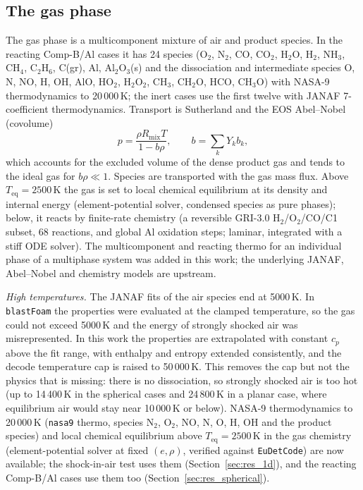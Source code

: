 \documentclass{article}
\begin{document}
\subsection{The gas phase}
\label{sec:gasphase}

The gas phase is a multicomponent mixture of air and product species. In the reacting Comp-B/Al cases it has 24 species (O$_2$, N$_2$, CO, CO$_2$, H$_2$O, H$_2$, NH$_3$, CH$_4$, C$_2$H$_6$, C(gr), Al, Al$_2$O$_3$(s) and the dissociation and intermediate species O, N, NO, H, OH, AlO, HO$_2$, H$_2$O$_2$, CH$_3$, CH$_2$O, HCO, CH$_3$O) with NASA-9 thermodynamics to 20\,000\,K; the inert cases use the first twelve with JANAF 7-coefficient thermodynamics. Transport is Sutherland and the EOS Abel--Nobel (covolume)
\begin{equation}
    p = \frac{\rho R_\text{mix} T}{1 - b\rho}, \qquad b = \sum_k Y_k b_k,
\end{equation}
which accounts for the excluded volume of the dense product gas and tends to the ideal gas for $b\rho \ll 1$. Species are transported with the gas mass flux. Above $T_\text{eq} = 2500$\,K the gas is set to local chemical equilibrium at its density and internal energy (element-potential solver, condensed species as pure phases); below, it reacts by finite-rate chemistry (a reversible GRI-3.0 H$_2$/O$_2$/CO/C1 subset, 68 reactions, and global Al oxidation steps; laminar, integrated with a stiff ODE solver). The multicomponent and reacting thermo for an individual phase of a multiphase system was added in this work; the underlying JANAF, Abel--Nobel and chemistry models are upstream.

\emph{High temperatures.} The JANAF fits of the air species end at 5000\,K. In \texttt{blastFoam} the properties were evaluated at the clamped temperature, so the gas could not exceed 5000\,K and the energy of strongly shocked air was misrepresented. In this work the properties are extrapolated with constant $c_p$ above the fit range, with enthalpy and entropy extended consistently, and the decode temperature cap is raised to 50\,000\,K. This removes the cap but not the physics that is missing: there is no dissociation, so strongly shocked air is too hot (up to 14\,400\,K in the spherical cases and 24\,800\,K in a planar case, where equilibrium air would stay near 10\,000\,K or below). NASA-9 thermodynamics to 20\,000\,K (\texttt{nasa9} thermo, species N$_2$, O$_2$, NO, N, O, H, OH and the product species) and local chemical equilibrium above $T_\text{eq} = 2500$\,K in the gas chemistry (element-potential solver at fixed $(e, \rho)$, verified against \texttt{EuDetCode}) are now available; the shock-in-air test uses them (Section~\ref{sec:res_1d}), and the reacting Comp-B/Al cases use them too (Section~\ref{sec:res_spherical}).
\end{document}
